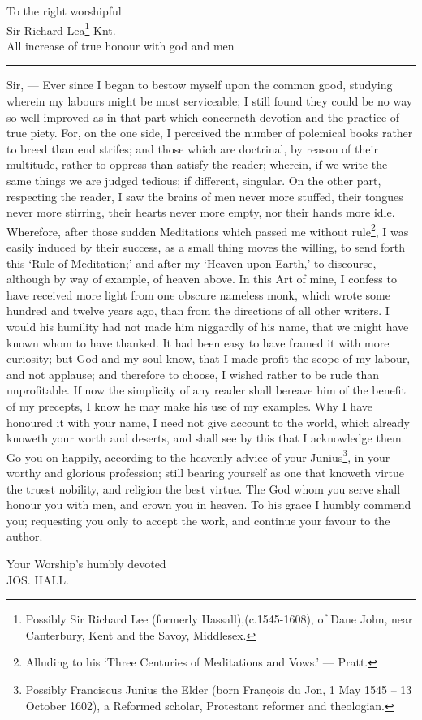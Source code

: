 \begin{center}
    To the right worshipful\\Sir Richard Lea\footnote{Possibly Sir Richard Lee (formerly Hassall),(c.1545-1608), of Dane John, near Canterbury, Kent and the Savoy, Middlesex.\cite{thrush2010}} Knt.\\All increase of true honour with god and men
\end{center}
    \vspace{5pt}
    \hrule
    \vspace{6pt}
    Sir, --- Ever since I began to bestow myself upon the common good, studying wherein my labours might be most serviceable; I still found they could be no way so well improved as in that part which concerneth devotion and the practice of true piety. For, on the one side, I perceived the number of polemical books rather to breed than end strifes; and those which are doctrinal, by reason of their multitude, rather to oppress than satisfy the reader; wherein, if we write the same things we are judged tedious; if different, singular. On the other part, respecting the reader, I saw the brains of men never more stuffed, their tongues never more stirring, their hearts never more empty, nor their hands more idle. Wherefore, after those sudden Meditations which passed me without rule\footnote{Alluding to his `Three Centuries of Meditations and Vows.' — Pratt.}, I was easily induced by their success, as a small thing moves the willing, to send forth this `Rule of Meditation;' and after my `Heaven upon Earth,'\cite{hall1606a} to discourse, although by way of example, of heaven above. In this Art of mine, I confess to have received more light from one obscure nameless monk, which wrote some hundred and twelve years ago, than from the directions of all other writers. I would his humility had not made him niggardly of his name, that we might have known whom to have thanked. It had been easy to have framed it with more curiosity; but God and my soul know, that I made profit the scope of my labour, and not applause; and therefore to choose, I wished rather to be rude than unprofitable. If now the simplicity of any reader shall bereave him of the benefit of my precepts, I know he may make his use of my examples. Why I have honoured it with your name, I need not give account to the world, which already knoweth your worth and deserts, and shall see by this that I acknowledge them. Go you on happily, according to the heavenly advice of your Junius\footnote{Possibly Franciscus Junius the Elder (born François du Jon, 1 May 1545 – 13 October 1602), a Reformed scholar, Protestant reformer and theologian.\cite{brit1911}}, in your worthy and glorious profession; still bearing yourself as one that knoweth virtue the truest nobility, and religion the best virtue. The God whom you serve shall honour you with men, and crown you in heaven. To his grace I humbly commend you; requesting you only to accept the work, and continue your favour to the author. 
    \begin{flushright}
    Your Worship's humbly devoted\\\uppercase{Jos. Hall.}
    \end{flushright}    
    